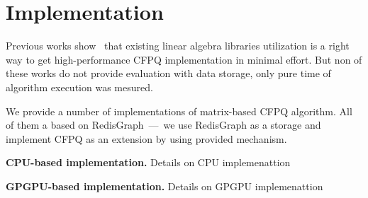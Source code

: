 \section{Implementation}

Previous works show~\cite{Mishin:2019:ECP:3327964.3328503, Azimov:2018:CPQ:3210259.3210264} that existing linear algebra libraries utilization is a right way to get high-performance CFPQ implementation in minimal effort.
But non of these works do not provide evaluation with data storage, only pure time of algorithm execution was mesured. 

We provide a number of implementations of matrix-based CFPQ algorithm.
All of them a based on RedisGraph~---~we use RedisGraph as a storage and implement CFPQ as an extension by using provided mechanism.
 
\textbf{CPU-based implementation.}
Details on CPU implemenattion

\textbf{GPGPU-based implementation.}
Details on GPGPU implemenattion

